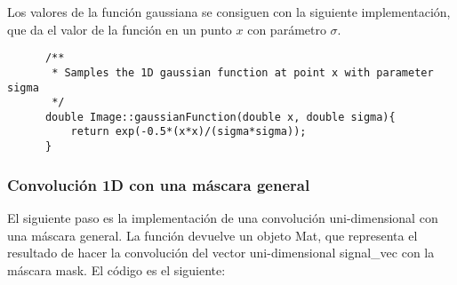 \documentclass[a4paper, 11pt]{article}
\theoremstyle{definition}
\theoremstyle{theorem}
\begin{document}
  Los valores de la función gaussiana se consiguen con la siguiente implementación, que da el valor de la función en un punto $x$ con parámetro $\sigma$.
  \begin{lstlisting}
      /**
       * Samples the 1D gaussian function at point x with parameter sigma
       */
      double Image::gaussianFunction(double x, double sigma){
          return exp(-0.5*(x*x)/(sigma*sigma));
      }
  \end{lstlisting}

  \subsubsection*{Convolución 1D con una máscara general}

  El siguiente paso es la implementación de una convolución uni-dimensional con una máscara general. La función devuelve un objeto Mat, que representa el resultado de hacer la convolución del vector uni-dimensional signal\_vec con la máscara mask. El código es el siguiente:
\end{document}
